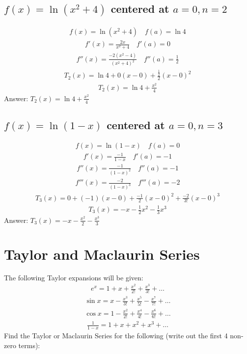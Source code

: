 \documentclass{article}
\begin{document}
\subsection{$f(x) = \ln{(x^2 + 4)}$ centered at $a = 0, n = 2$}
\begin{align*}
	f(x) = \ln{(x^2 + 4)} \quad f(a) = \ln{4}
\end{align*}
\begin{align*}
	f'(x) = \frac{2x}{x^2 + 4} \quad f'(a) = 0
\end{align*}
\begin{align*}
	f''(x) = \frac{-2(x^2-4)}{(x^2+4)^2} \quad f''(a) = \frac{1}{2}
\end{align*}
\begin{align*}
	T_2(x) = \ln{4} + 0(x - 0) + \frac{\frac{1}{2}}{2} (x - 0)^2
\end{align*}
\begin{align*}
	T_2 (x) = \ln{4} + \frac{x^2}{4}
\end{align*}
Answer: $T_2 (x) = \ln{4} + \frac{x^2}{4}$

\subsection{$f(x) = \ln{(1 - x)}$ centered at $a = 0, n = 3$}
\begin{align*}
	f(x) = \ln{(1 - x)} \quad f(a) = 0
\end{align*}
\begin{align*}
	f'(x) = \frac{-1}{1 - x} \quad f'(a) = -1
\end{align*}
\begin{align*}
	f''(x) = \frac{-1}{(1 - x)^2} \quad f''(a) = -1
\end{align*}
\begin{align*}
	f'''(x) = \frac{-2}{(1 - x)^3} \quad f'''(a) = -2
\end{align*}
\begin{align*}
	T_3(x) = 0 + (-1)(x - 0) + \frac{-1}{2}(x - 0)^2 + \frac{-2}{3!}(x - 0)^3
\end{align*}
\begin{align*}
	T_3(x) = -x -\frac{1}{2}x^2 -\frac{1}{3}x^3
\end{align*}
Answer: $T_3 (x) = -x - \frac{x^2}{2} - \frac{x^3}{3}$

\section{Taylor and Maclaurin Series}
The following Taylor expansions will be given:
\begin{align*}
	e^x = 1 + x + \frac{x^2}{2!} + \frac{x^3}{3!} + \dots
\end{align*}
\begin{align*}
	\sin{x} = x - \frac{x^3}{3!} + \frac{x^5}{5!} - \frac{x^7}{7!} + \dots
\end{align*}
\begin{align*}
	\cos{x} = 1 - \frac{x^2}{2!} + \frac{x^4}{4!} - \frac{x^6}{6!} + \dots
\end{align*}
\begin{align*}
	\frac{1}{1 - x} = 1 + x + x^2 + x^3 + \dots
\end{align*}
Find the Taylor or Maclaurin Series for the following (write out the first 4 non-zero terms):
\end{document}
